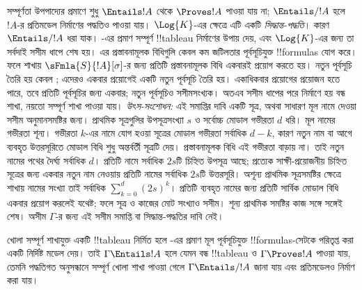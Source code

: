 \documentclass[../../../include/open-logic-section]{subfiles}
\begin{document}


\begin{explain}
  সম্পূর্ণতা উপপাদ্যের প্রমাণে শুধু
  $\Entails !A$ থেকে $\Proves !A$ পাওয়া যায় না;
  $\Entails/ !A$ হলে $!A$-র প্রতিমডেল নির্মাণের
  পদ্ধতিও পাওয়া যায়।
  $\Log{K}$-এর ক্ষেত্রে এটি একটি \emph{সিদ্ধান্ত-পদ্ধতি}।
  কারণ $\Entails/ !A$ ধরা যাক।
  -এর প্রমাণ
  সম্পূর্ণ !!{tableau} নির্মাণের উপায় দেয়, এবং
  $\Log{K}$-এর জন্য তা সর্বদাই সসীম ধাপে শেষ হয়।
  এর প্রস্তাবনামূলক বিধিগুলি কেবল কম জটিলতার
  পূর্বসূচিযুক্ত !!{formula}s যোগ করে। ফলে শাখায়
  $\sFmla{S}{!A}[\sigma]$-র জন্য প্রতিটি
  প্রস্তাবনামূলক বিধি একবারই প্রয়োগ করতে হয়।
  নতুন পূর্বসূচি তৈরি হয় কেবল
  ;
  এদেরও একবার প্রয়োগেই একটি নতুন পূর্বসূচি তৈরি হয়।
  একাধিকবার প্রয়োগের প্রয়োজন হতে পারে, তবে প্রতিটি
  পূর্বসূচির জন্য একবার; নতুন পূর্বসূচিও সসীমসংখ্যক।
  অতএব সসীম ধাপের পরে নির্মাণে হয় বন্ধ শাখা,
  নয়তো সম্পূর্ণ শাখা পাওয়া যায়।
  \emph{উৎস-সংশোধন:} এই সমাপ্তির দাবি একটি সূত্র, অথবা সাধারণ মূল নামে দেওয়া সসীম অনুমানসমষ্টির জন্য। প্রাথমিক সূত্রগুলির উপসূত্রসংখ্যা $s$ ও সর্বোচ্চ মোডাল গভীরতা $d$ ধরি। মূল নামের গভীরতা শূন্য। গভীরতা $k$-এর নামে যোগ হওয়া সূত্রের মোডাল গভীরতা সর্বাধিক $d-k$, কারণ নতুন নাম বা আগে ব্যবহৃত উত্তরসূরিতে মোডাল বিধি শুধু অন্তর্বর্তী সূত্রটি দেয়। প্রস্তাবনামূলক বিধি এই গভীরতা বাড়ায় না। তাই নতুন নামের পথের দৈর্ঘ্য সর্বাধিক $d$। প্রতিটি নামে সর্বাধিক $2s$টি চিহ্নিত উপসূত্র আছে; প্রত্যেক সাক্ষী-প্রয়োজনীয় চিহ্নিত সূত্রের জন্য একবার নতুন নাম নেওয়ায় প্রতিটি নামের সর্বাধিক $2s$টি উত্তরসূরি। অশূন্য প্রাথমিক সূত্রসমষ্টির ক্ষেত্রে শাখায় নামের সংখ্যা তাই সর্বাধিক $\sum_{k=0}^{d}(2s)^k$। প্রতিটি ব্যবহৃত নামের জন্য প্রতিটি সার্বিক মোডাল বিধি একবার প্রয়োগ করলেই যথেষ্ট; ফলে সূত্র ও কাজের মোট সংখ্যাও সসীম। শূন্য প্রাথমিক সমষ্টির কাজ সঙ্গে সঙ্গেই শেষ। অসীম $\Gamma$-র জন্য এই সসীম সমাপ্তি বা সিদ্ধান্ত-পদ্ধতির দাবি নেই।

  খোলা সম্পূর্ণ শাখাযুক্ত একটি !!{tableau} নির্মিত হলে
  -এর প্রমাণ
  মূল পূর্বসূচিযুক্ত !!{formula}s-সেটকে পরিতৃপ্ত করা
  একটি নির্দিষ্ট মডেল দেয়। তাই $\Gamma \Entails !A$
  হলে যেমন বন্ধ !!{tableau} ও $\Gamma \Proves !A$
  পাওয়া যায়, তেমনি পদ্ধতিগত অনুসন্ধানে সম্পূর্ণ খোলা
  শাখা পাওয়া গেলে $\Gamma \Entails/ !A$ জানা যায়
  এবং প্রতিমডেলও নির্মাণ করা যায়।
\end{explain}
\end{document}
